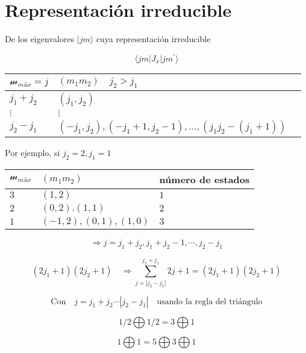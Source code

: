 \documentclass{report}
\begin{document}
\section{Representaci\'on irreducible}

De los eigenvalores $|jm\rangle$ cuya representación irreducible

\[\langle jm | J_x | jm^{\prime }\rangle\]


\begin{center}
    \begin{tabular}{| l | l | l |}
    \hline
    $\mathscr{m}_{máx} = j$ & $(m_1 m_2 ) \quad j_{2} > j_1 $ &   \\ \hline
    $j_1 + j_2 $ & $(j_1 , j_2 )$ &    \\ \hline
    $\vdots$ & $\vdots$ &   \\ \hline
   $j_2 - j_1$ & $(-j_1 , j_2 ) , (-j_1 + 1 , j_2 -1 ) , \ldots , (j_1 j_2 -(j_1 +1)) $ &\\ \hline

    \end{tabular}
\end{center}

Por ejemplo, si $j_2 = 2 , j_1 = 1$

\begin{center}
    \begin{tabular}{| l | l | l |}
    \hline
    $\mathscr{m}_{máx} $ & $(m_1 m_2 ) $ & número de estados   \\ \hline
    $3$ & $(1 ,2 )$ & $1$   \\ \hline
    $2$ & $(0,2) . (1,1)$ & $2$   \\ \hline
  $1$ & $(-1,2) , (0,1) , (1,0)$  & $3$ \\ \hline

    \end{tabular}
\end{center}

\[\Rightarrow j = j_1 + j_2 , j_1 + j_2 -1 , \cdots , j_2 - j_1\]

\[(2j_1 + 1)(2j_2 +1) \quad \Rightarrow \sum _{j = |j_2 - j_1 |}^{j_2 + j_1 } 2j+1 = (2j_1 + 1) (2j_2 +1)\]



\[\text{Con} \quad j = j_1 + j_2 \cdots |j_2 - j_1 | \quad \text{usando la regla del triángulo}\]

\[1/2 \bigoplus 1/2 = 3 \bigoplus 1\]

\begin{equation}
1 \bigoplus 1 = 5 \bigoplus 3 \bigoplus 1
\end{equation}
\end{document}
